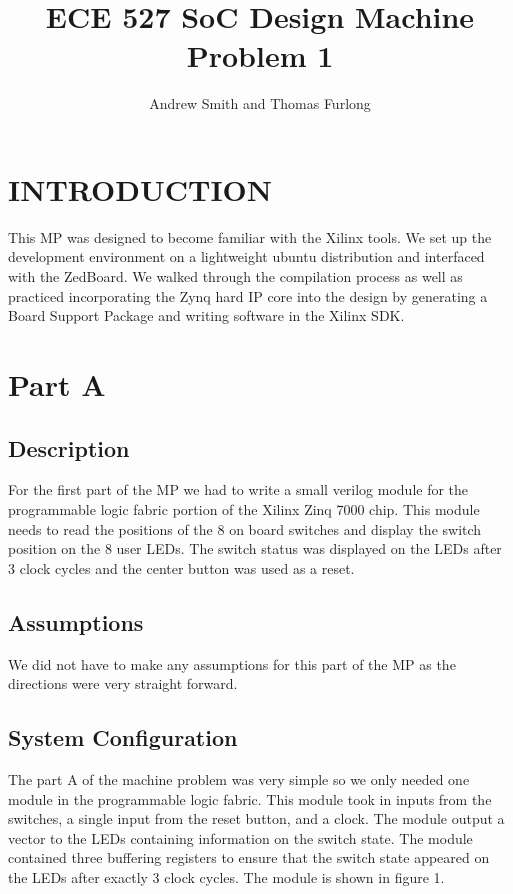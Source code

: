 \documentclass[letterpaper, 10 pt, conference]{IEEEconf}  %
\title{\LARGE \bf ECE 527 SoC Design Machine Problem 1}
\author{Andrew Smith and Thomas Furlong}%
\begin{document}
\maketitle
\thispagestyle{empty}
\pagestyle{empty}


\section{INTRODUCTION}

This MP was designed to become familiar with the Xilinx tools. We set up the development environment on a lightweight ubuntu distribution and interfaced with the ZedBoard. We walked through the compilation process as well as practiced incorporating the Zynq hard IP core into the design by generating a Board Support Package and writing software in the Xilinx SDK.

\section{Part A}
\subsection{Description}
For the first part of the MP we had to write a small verilog module for the programmable logic fabric portion of the Xilinx Zinq 7000 chip. This module needs to read the positions of the 8 on board switches and display the switch position on the 8 user LEDs. The switch status was displayed on the LEDs after 3 clock cycles and the center button was used as a reset.

\subsection{Assumptions}
We did not have to make any assumptions for this part of the MP as the directions were very straight forward.

\subsection{System Configuration}
The part A of the machine problem was very simple so we only needed one module in the programmable logic fabric. This module took in inputs from the switches, a single input from the reset button, and a clock. The module output a vector to the LEDs containing information on the switch state. The module contained three buffering registers to ensure that the switch state appeared on the LEDs after exactly 3 clock cycles. The module is shown in figure 1.
\end{document}
